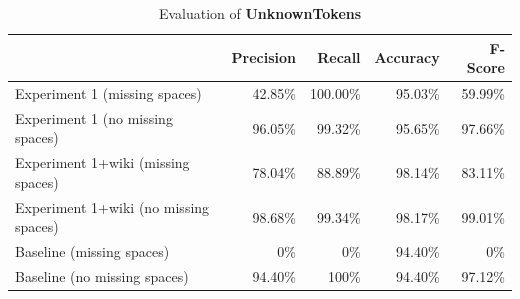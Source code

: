 \documentclass[a4paper,10pt]{scrartcl}
\begin{document}
\begin{table}

\begin{center}
\begin{tabular}{l|r|r|r|r}
& Precision & Recall & Accuracy & F-Score \\
\hline
Experiment 1 (missing spaces) & 42.85\% & 100.00\% & 95.03\% & 59.99\% \\
\hline %
Experiment 1 (no missing spaces) & 96.05\% & 99.32\% & 95.65\% & 97.66\% \\
\hline
Experiment 1+wiki (missing spaces) & 78.04\% & 88.89\% & 98.14\% & 83.11\% \\ %
\hline
Experiment 1+wiki (no missing spaces) & 98.68\% & 99.34\% & 98.17\% & 99.01\% \\ %
\hline
Baseline (missing spaces) & 0\% & 0\% & 94.40\% & 0\% \\ %
\hline
Baseline (no missing spaces) & 94.40\% & 100\% & 94.40\% & 97.12\% \\
\end{tabular}
\end{center}
\caption{Evaluation of \textbf{UnknownTokens}} %
\label{eval3}
\end{table}
\end{document}
